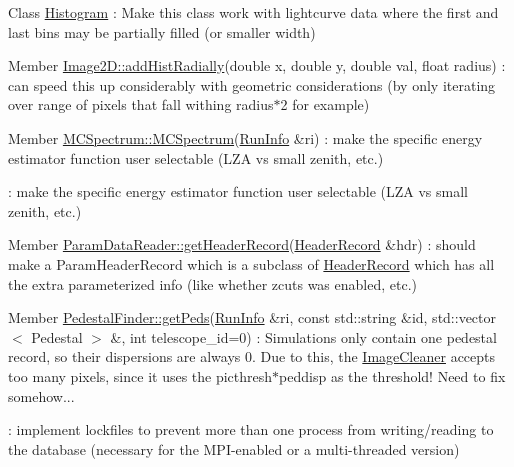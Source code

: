 \label{todo__todo000020}
\hypertarget{todo__todo000020}{}
 
\begin{DoxyDescription}
\item[Class \hyperlink{classHistogram}{Histogram} ]: Make this class work with lightcurve data where the first and last bins may be partially filled (or smaller width) 
\end{DoxyDescription}

\label{todo__todo000021}
\hypertarget{todo__todo000021}{}
 
\begin{DoxyDescription}
\item[Member \hyperlink{classImage2D_afa47c6e966ae69c72bb58e97f1e58858}{Image2D::addHistRadially}(double x, double y, double val, float radius) ]: can speed this up considerably with geometric considerations (by only iterating over range of pixels that fall withing radius$\ast$2 for example) 
\end{DoxyDescription}

\label{todo__todo000013}
\hypertarget{todo__todo000013}{}
 
\begin{DoxyDescription}
\item[Member \hyperlink{classMCSpectrum_ae7bb310b53fe6faf2fbdb74017c627db}{MCSpectrum::MCSpectrum}(\hyperlink{classRunInfo}{RunInfo} \&ri) ]: make the specific energy estimator function user selectable (LZA vs small zenith, etc.) 

: make the specific energy estimator function user selectable (LZA vs small zenith, etc.) 
\end{DoxyDescription}

\label{todo__todo000023}
\hypertarget{todo__todo000023}{}
 
\begin{DoxyDescription}
\item[Member \hyperlink{classParamDataReader_a6c08000e4e3d408ae14b3146145a1249}{ParamDataReader::getHeaderRecord}(\hyperlink{structHeaderRecord}{HeaderRecord} \&hdr) ]: should make a ParamHeaderRecord which is a subclass of \hyperlink{structHeaderRecord}{HeaderRecord} which has all the extra parameterized info (like whether zcuts was enabled, etc.) 
\end{DoxyDescription}

\label{todo__todo000028}
\hypertarget{todo__todo000028}{}
 
\begin{DoxyDescription}
\item[Member \hyperlink{classPedestalFinder_a2f74e3e8ba1b0531f69949adb46d0657}{PedestalFinder::getPeds}(\hyperlink{classRunInfo}{RunInfo} \&ri, const std::string \&id, std::vector$<$ Pedestal $>$ \&, int telescope\_\-id=0) ]: Simulations only contain one pedestal record, so their dispersions are always 0. Due to this, the \hyperlink{classImageCleaner}{ImageCleaner} accepts too many pixels, since it uses the picthresh$\ast$peddisp as the threshold! Need to fix somehow...

: implement lockfiles to prevent more than one process from writing/reading to the database (necessary for the MPI-\/enabled or a multi-\/threaded version) 
\end{DoxyDescription}

